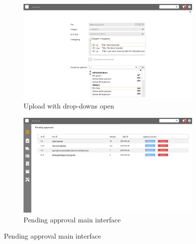 \begin{figure}[H]\ContinuedFloat
	\centering
	\begin{subfigure}[b]{0.48\textwidth}
		\includegraphics[width=\textwidth]{billeder/iteration3Prototyper/Page_10.jpg}
		\caption{Upload with drop-downs open}
		\label{fig:5-Upload 3}
	\end{subfigure}
	\quad
	\begin{subfigure}[b]{0.48\textwidth}
		\includegraphics[width=\textwidth]{billeder/iteration3Prototyper/Page_18.jpg}
		\caption{Pending approval main interface}
		\label{fig:5-Approval1}
	\end{subfigure}
\end{figure}
